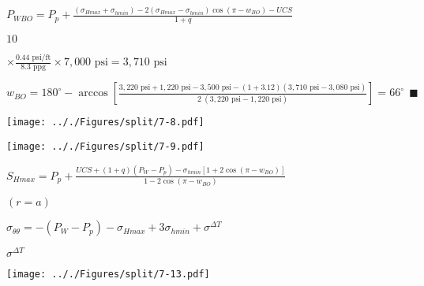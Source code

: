 \documentclass[onecolumn,11pt]{report}
\def\lthtmlcheckvsize{\ifdim\ht\sizebox<\vsize 
  \ifdim\wd\sizebox<\hsize\expandafter\hfill\fi \expandafter\vfill
  \else\expandafter\vss\fi}%
\begin{document}
{\newpage\clearpage
{}%
$\displaystyle P_{WBO} = P_p + \frac{ (\sigma_{Hmax} + \sigma_{hmin})
- 2(\sigma_{Hmax} - \sigma_{hmin}) \cos (\pi - w_{BO}) - UCS}{1+q}$%
\lthtmlindisplaymathZ
\lthtmlcheckvsize\clearpage}

{\newpage\clearpage
{}%
$\displaystyle 10$%
\lthtmlindisplaymathZ
\lthtmlcheckvsize\clearpage}

{\newpage\clearpage
{}%
$\displaystyle \times
\frac{0.44 \text{ psi/ft}} {8.3 \text{ ppg}} \times
7,000 \text{ psi} = 3,710 \text{ psi}
$%
\lthtmlindisplaymathZ
\lthtmlcheckvsize\clearpage}

{\newpage\clearpage
{}%
$\displaystyle w_{BO} = 180^{\circ} - \arccos \left[ \frac{ 3,220 \text{ psi} + 1,220 \text{ psi} - 3,500 \text{ psi} - (1+3.12)(3,710 \text{ psi} - 3,080 \text{ psi})}{2 \: (3,220 \text{ psi} - 1,220 \text{ psi})} \right] = 66 ^{\circ} \: \: \blacksquare
$%
\lthtmlindisplaymathZ
\lthtmlcheckvsize\clearpage}

{\newpage\clearpage
{}%
\texttt{[image: .././Figures/split/7-8.pdf]}%
\lthtmlpictureZ
\lthtmlcheckvsize\clearpage}

{\newpage\clearpage
{}%
\texttt{[image: .././Figures/split/7-9.pdf]}%
\lthtmlpictureZ
\lthtmlcheckvsize\clearpage}

{\newpage\clearpage
{}%
$\displaystyle S_{Hmax} = P_p + \frac{UCS + (1+q)(P_W - P_p)
- \sigma_{hmin} \left[ 1 + 2 \cos (\pi - w_{BO}) \right]}
{1 - 2 \cos (\pi - w_{BO})}$%
\lthtmlindisplaymathZ
\lthtmlcheckvsize\clearpage}

{\newpage\clearpage
{}%
$ (r=a)$%
\lthtmlindisplaymathZ
\lthtmlcheckvsize\clearpage}

{\newpage\clearpage
{}%
$\displaystyle \sigma_{\theta \theta}  =
-(P_W - P_p) -\sigma_{Hmax} + 3 \sigma_{hmin}
+ \sigma^{\Delta T}$%
\lthtmlindisplaymathZ
\lthtmlcheckvsize\clearpage}

{\newpage\clearpage
{}%
$ \sigma^{\Delta T}$%
\lthtmlindisplaymathZ
\lthtmlcheckvsize\clearpage}

{\newpage\clearpage
{}%
\texttt{[image: .././Figures/split/7-13.pdf]}%
\lthtmlpictureZ
\lthtmlcheckvsize\clearpage}
\end{document}
